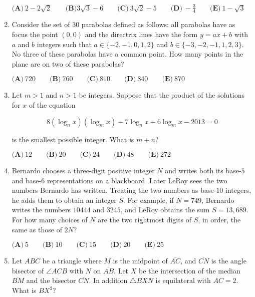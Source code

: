 \documentclass{article}
\begin{document}
\begin{enumerate}[label=\arabic*., itemsep=0.5em]
\( \textbf{(A)}\ 2-2\sqrt{2}\qquad\textbf{(B)} 3\sqrt{3}-6\qquad\textbf{(C)}\ 3\sqrt{2}-5\qquad\textbf{(D)}\ -\frac{3}{4}\qquad\textbf{(E)}\ 1-\sqrt{3}\)\par \vspace{0.5em}\item Consider the set of \(30\) parabolas defined as follows: all parabolas have as focus the point \((0,0)\) and the directrix lines have the form \(y=ax+b\) with \(a\) and \(b\) integers such that \(a\in \{-2,-1,0,1,2\}\) and \(b\in \{-3,-2,-1,1,2,3\}\). No three of these parabolas have a common point. How many points in the plane are on two of these parabolas?

\( \textbf{(A)}\ 720\qquad\textbf{(B)}\ 760\qquad\textbf{(C)}\ 810\qquad\textbf{(D)}\ 840\qquad\textbf{(E)}\ 870 \)\par \vspace{0.5em}\item Let \(m>1\) and \(n>1\) be integers. Suppose that the product of the solutions for \(x\) of the equation

\begin{equation*}
8(\log_n x)(\log_m x)-7\log_n x-6 \log_m x-2013 = 0
\end{equation*}

is the smallest possible integer. What is \(m+n\)?

\( \textbf{(A)}\ 12\qquad\textbf{(B)}\ 20\qquad\textbf{(C)}\ 24\qquad\textbf{(D)}\ 48\qquad\textbf{(E)}\ 272 \)\par \vspace{0.5em}\item Bernardo chooses a three-digit positive integer \(N\) and writes both its base-\(5\) and base-\(6\) representations on a blackboard. Later LeRoy sees the two numbers Bernardo has written. Treating the two numbers as base-\(10\) integers, he adds them to obtain an integer \(S\). For example, if \(N=749\), Bernardo writes the numbers \(10444\) and \(3245\), and LeRoy obtains the sum \(S=13,689\). For how many choices of \(N\) are the two rightmost digits of \(S\), in order, the same as those of \(2N\)?

\( \textbf{(A)}\ 5\qquad\textbf{(B)}\ 10\qquad\textbf{(C)}\ 15\qquad\textbf{(D)}\ 20\qquad\textbf{(E)}\ 25 \)\par \vspace{0.5em}\item Let \(ABC\) be a triangle where \(M\) is the midpoint of \(\overline{AC}\), and \(\overline{CN}\) is the angle bisector of \(\angle{ACB}\) with \(N\) on \(\overline{AB}\). Let \(X\) be the intersection of the median \(\overline{BM}\) and the bisector \(\overline{CN}\). In addition \(\triangle BXN\) is equilateral with \(AC=2\). What is \(BX^2\)?


\end{enumerate}
\end{document}
